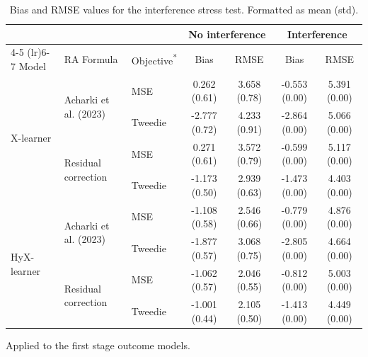 \begin{table}[H]
    \centering
    \caption{Bias and RMSE values for the interference stress test. Formatted as mean (std).}
    \label{tab:interference_test}
    \begin{threeparttable}
        \begin{tabular}{l l l c c c c}
            \toprule
            & & & \multicolumn{2}{c}{No interference} & \multicolumn{2}{c}{Interference} \\
            \cmidrule(lr){4-5} \cmidrule(lr){6-7}
            Model & RA Formula & Objective\textsuperscript{*} & Bias & RMSE & Bias & RMSE \\
            \midrule
            \multirow{4}{*}{X-learner}
                & \multirow{2}{*}{Acharki et al. (2023)}
                                & MSE     & 0.262 (0.61) & 3.658 (0.78) & -0.553 (0.00) & 5.391 (0.00) \\
                &               & Tweedie & -2.777 (0.72) & 4.233 (0.91) & -2.864 (0.00) & 5.066 (0.00) \\
                & \multirow{2}{*}{Residual correction}
                                & MSE     & 0.271 (0.61) & 3.572 (0.79) & -0.599 (0.00) & 5.117 (0.00) \\
                &               & Tweedie & -1.173 (0.50) & 2.939 (0.63) & -1.473 (0.00) & 4.403 (0.00) \\
            \midrule
            \multirow{4}{*}{HyX-learner}
                & \multirow{2}{*}{Acharki et al. (2023)}
                                & MSE     & -1.108 (0.58) & 2.546 (0.66) & -0.779 (0.00) & 4.876 (0.00) \\
                &               & Tweedie & -1.877 (0.57) & 3.068 (0.75) & -2.805 (0.00) & 4.664 (0.00) \\
                & \multirow{2}{*}{Residual correction}
                                & MSE     & -1.062 (0.57) & 2.046 (0.55) & -0.812 (0.00) & 5.003 (0.00) \\
                &               & Tweedie & -1.001 (0.44) & 2.105 (0.50) & -1.413 (0.00) & 4.449 (0.00) \\
            \bottomrule
        \end{tabular}
        \begin{tablenotes}
            \small
            \item[*] Applied to the first stage outcome models.
        \end{tablenotes}
    \end{threeparttable}
\end{table}